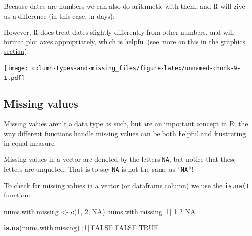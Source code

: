 \documentclass[]{article}
\newenvironment{Shaded}{\begin{snugshade}}{\end{snugshade}}
\newcommand{\DataTypeTok}[1]{\textcolor[rgb]{0.13,0.29,0.53}{#1}}
\newcommand{\DecValTok}[1]{\textcolor[rgb]{0.00,0.00,0.81}{#1}}
\newcommand{\KeywordTok}[1]{\textcolor[rgb]{0.13,0.29,0.53}{\textbf{#1}}}
\newcommand{\NormalTok}[1]{#1}
\newcommand{\OperatorTok}[1]{\textcolor[rgb]{0.81,0.36,0.00}{\textbf{#1}}}
\newcommand{\OtherTok}[1]{\textcolor[rgb]{0.56,0.35,0.01}{#1}}
\newcommand{\StringTok}[1]{\textcolor[rgb]{0.31,0.60,0.02}{#1}}
\begin{document}
Because dates are numbers we can also do arithmetic with them, and R will give us a difference (in this case, in days):

\begin{Shaded}
\end{Shaded}

However, R does treat dates slightly differently from other numbers, and will format plot axes appropriately, which is helpful (see more on this in the \protect\hyperlink{graphics}{graphics section}):

\begin{Shaded}
\end{Shaded}

\texttt{[image: column-types-and-missing\_files/figure-latex/unnamed-chunk-9-1.pdf]}

\hypertarget{missingvalues}{%
\subsection*{Missing values}\label{missingvalues}}

Missing values aren't a data type as such, but are an important concept in R; the way different functions handle missing values can be both helpful and frustrating in equal measure.

Missing values in a vector are denoted by the letters \texttt{NA}, but notice that these letters are unquoted. That is to say \texttt{NA} is not the same as \texttt{"NA"}!

To check for missing values in a vector (or dataframe column) we use the \texttt{is.na()} function:

\begin{Shaded}
\begin{Highlighting}[]
\NormalTok{nums.with.missing <-}\StringTok{ }\KeywordTok{c}\NormalTok{(}\DecValTok{1}\NormalTok{, }\DecValTok{2}\NormalTok{, }\OtherTok{NA}\NormalTok{)}
\NormalTok{nums.with.missing}
\NormalTok{[}\DecValTok{1}\NormalTok{]  }\DecValTok{1}  \DecValTok{2} \OtherTok{NA}

\KeywordTok{is.na}\NormalTok{(nums.with.missing)}
\NormalTok{[}\DecValTok{1}\NormalTok{] }\OtherTok{FALSE} \OtherTok{FALSE}  \OtherTok{TRUE}
\end{Highlighting}
\end{Shaded}
\end{document}

